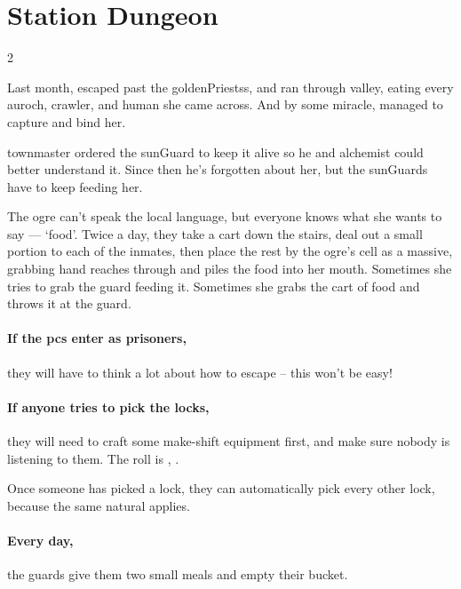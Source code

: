 \section{Station Dungeon}
\label{stationDungeon}

\begin{multicols}{2}

\prisonMap

\begin{exampletext}
  \noindent
  Last month,  escaped past the \glspl{goldenPriests}, and ran through \gls{valley}, eating every auroch, \gls{crawler}, and human she came across.
  And by some miracle,  managed to capture and bind her.

  \Gls{townmaster} ordered the \gls{sunGuard} to keep it alive so he and \gls{alchemist} could better understand it.
  Since then he's forgotten about her, but the \glspl{sunGuard} have to keep feeding her.

  The \gls{ogre} can't speak the local language, but everyone knows what she wants to say --- `food'.
  Twice a day, they take a cart down the stairs, deal out a small portion to each of the inmates, then place the rest by the \gls{ogre}'s cell as a massive, grabbing hand reaches through and piles the food into her mouth.
  Sometimes she tries to grab the guard feeding it.
  Sometimes she grabs the cart of food and throws it at the guard.
\end{exampletext}

\paragraph{If the \glspl{pc} enter as prisoners,}
they will have to think a lot about how to escape -- this won't be easy!

\paragraph{If anyone tries to pick the locks,}
they will need to craft some make-shift equipment first, and make sure nobody is listening to them.
The roll is , \tn[12].

Once someone has picked a lock, they can automatically pick every other lock, because the same \gls{natural} applies.

\paragraph{Every day,}
the guards give them two small meals and empty their bucket.


\end{multicols}
